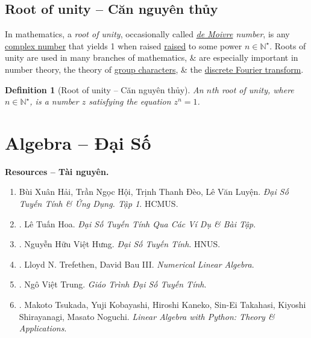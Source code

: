 \documentclass{article}
\newtheorem{definition}{Definition}
\begin{document}
\subsection{Root of unity -- Căn nguyên thủy}
In mathematics, a {\it root of unity}, occasionally called {\it\href{https://en.wikipedia.org/wiki/Abraham_de_Moivre}{de Moivre} number}, is any \href{https://en.wikipedia.org/wiki/Complex_number}{complex number} that yields 1 when raised \href{https://en.wikipedia.org/wiki/Exponentiation}{raised} to some power $n\in\mathbb{N}^\star$. Roots of unity are used in many branches of mathematics, \& are especially important in number theory, the theory of \href{https://en.wikipedia.org/wiki/Group_character}{group characters}, \& the \href{https://en.wikipedia.org/wiki/Discrete_Fourier_transform}{discrete Fourier transform}.

\begin{definition}[Root of unity -- Căn nguyên thủy]
	An {\rm$n$th root of unity}, where $n\in\mathbb{N}^\star$, is a number $z$ satisfying the equation $z^n = 1$.
\end{definition}


\section{Algebra -- Đại Số}
\label{sect: algebra}
\textbf{\textsf{Resources -- Tài nguyên.}}
\begin{enumerate}
	\item {\sc Bùi Xuân Hải, Trần Ngọc Hội, Trịnh Thanh Đèo, Lê Văn Luyện}. {\it Đại Số Tuyến Tính \& Ứng Dụng. Tập 1}. HCMUS.
	\item \cite{Hoa_linear_algebra}. {\sc Lê Tuấn Hoa}. {\it Đại Số Tuyến Tính Qua Các Ví Dụ \& Bài Tập}.
	\item \cite{Hung_linear_algebra}. {\sc Nguyễn Hữu Việt Hưng}. {\it Đại Số Tuyến Tính}. HNUS.
	\item \cite{Trefethen_Bau1997,Trefethen_Bau2022}. {\sc Lloyd N. Trefethen, David Bau III}. {\it Numerical Linear Algebra}.
	\item \cite{Trung_linear_algebra}. {\sc Ngô Việt Trung}. {\it Giáo Trình Đại Số Tuyến Tính}.
	\item \cite{Tsukada_Kobayashi_Kaneko_Takahasi_Shirayanagi_Noguchi2023}. {\sc Makoto Tsukada, Yuji Kobayashi, Hiroshi Kaneko, Sin-Ei Takahasi, Kiyoshi Shirayanagi, Masato Noguchi}. {\it Linear Algebra with Python: Theory \& Applications}.
\end{enumerate}
\end{document}
